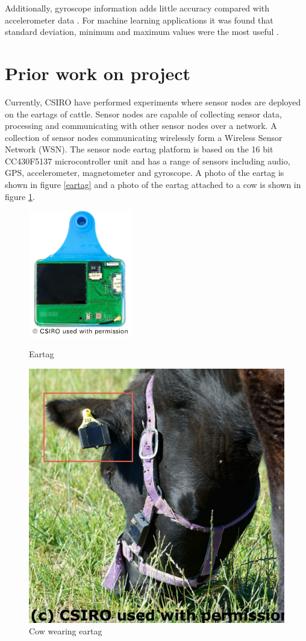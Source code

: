 Additionally, gyroscope information adds little accuracy compared with accelerometer data \cite{Gerencser2013}. For machine learning applications it was found that standard deviation, minimum and maximum values were the most useful \cite{Gerencser2013}. 


\section{Prior work on project}
\label{sec:prior work}
Currently, CSIRO have performed experiments where sensor nodes are deployed on the eartags of cattle. Sensor nodes are capable of collecting sensor data, processing and communicating with other sensor nodes over a network. A collection of sensor nodes communicating wirelessly form a Wireless Sensor Network (WSN). The sensor node eartag platform is based on the 16 bit CC430F5137 microcontroller unit and has a range of sensors including audio, GPS, accelerometer, magnetometer and gyroscope. A photo of the eartag is shown in figure \ref{eartag} and a photo of the eartag attached to a cow is shown in figure \ref{cow}.


\begin{figure}[H]
\centering
\begin{minipage}{.5\textwidth}
  \centering
  \includegraphics[width=0.4\textwidth]{images/eartag.png}
  \caption{Eartag}
  \label{eartag}
\end{minipage}%
\begin{minipage}{.5\textwidth}
  \centering
  \includegraphics[width=.5\textwidth]{images/cow.jpg}
  \caption{Cow wearing eartag}
  \label{cow}
\end{minipage}
\end{figure}


